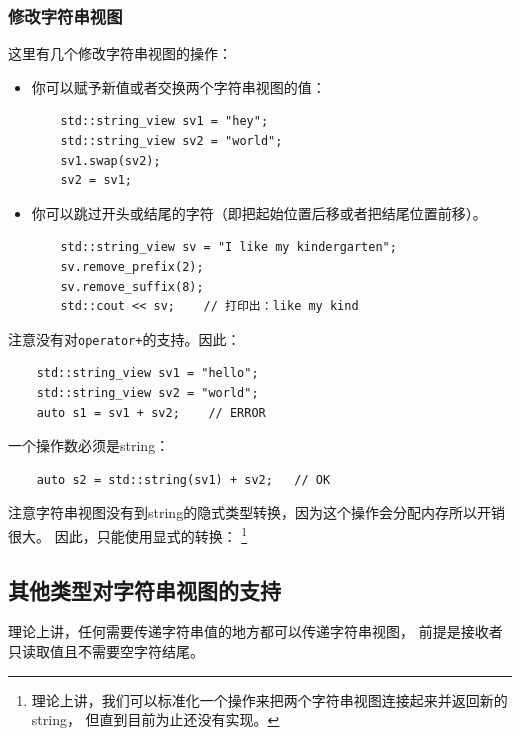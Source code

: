 \subsubsection{修改字符串视图}
这里有几个修改字符串视图的操作：
\begin{itemize}
    \item 你可以赋予新值或者交换两个字符串视图的值：
    \begin{lstlisting}
    std::string_view sv1 = "hey";
    std::string_view sv2 = "world";
    sv1.swap(sv2);
    sv2 = sv1;
    \end{lstlisting}
    \item 你可以跳过开头或结尾的字符（即把起始位置后移或者把结尾位置前移）。
    \begin{lstlisting}
    std::string_view sv = "I like my kindergarten";
    sv.remove_prefix(2);
    sv.remove_suffix(8);
    std::cout << sv;    // 打印出：like my kind
    \end{lstlisting}
\end{itemize}
注意没有对\texttt{operator+}的支持。因此：
\begin{lstlisting}
    std::string_view sv1 = "hello";
    std::string_view sv2 = "world";
    auto s1 = sv1 + sv2;    // ERROR
\end{lstlisting}
一个操作数必须是string：
\begin{lstlisting}
    auto s2 = std::string(sv1) + sv2;   // OK
\end{lstlisting}
注意字符串视图没有到string的隐式类型转换，因为这个操作会分配内存所以开销很大。
因此，只能使用显式的转换：
\footnote{理论上讲，我们可以标准化一个操作来把两个字符串视图连接起来并返回新的string，
但直到目前为止还没有实现。}

\subsection{其他类型对字符串视图的支持}
理论上讲，任何需要传递字符串值的地方都可以传递字符串视图，
前提是接收者只读取值且不需要空字符结尾。

